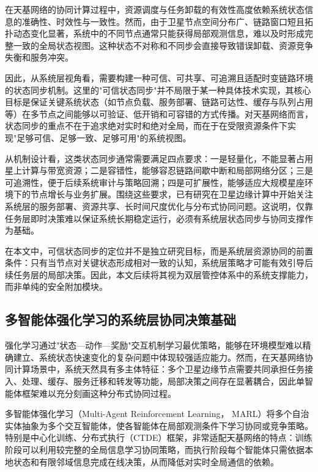 在天基网络的协同计算过程中，资源调度与任务卸载的有效性高度依赖系统状态信息的准确性、时效性与一致性。然而，由于卫星节点空间分布广、链路窗口短且拓扑动态变化显著，系统中的不同节点通常只能获得局部观测信息，难以及时形成完整一致的全局状态视图。这种状态不对称和不同步会直接导致错误卸载、资源竞争失衡和服务冲突。

因此，从系统层视角看，需要构建一种可信、可共享、可追溯且适配时变链路环境的状态同步机制。这里的"可信状态同步"并不局限于某一种具体技术实现，其核心目标是保证关键系统状态（如节点负载、服务部署、链路可达性、缓存与队列占用等）在多节点之间能够以可验证、低开销和可容错的方式传播。对天基网络而言，状态同步的重点不在于追求绝对实时和绝对全局，而在于在受限资源条件下实现"足够可信、足够一致、足够可用"的系统视图。

从机制设计看，这类状态同步通常需要满足四点要求：一是轻量化，不能显著占用星上计算与带宽资源；二是容错性，能够容忍链路间歇中断和局部网络分区；三是可追溯性，便于后续系统审计与策略回溯；四是可扩展性，能够适应大规模星座环境下的节点增长与业务扩展。围绕这些要求，已有研究在卫星边缘计算中开始关注系统层的服务部署、资源共享、长时间尺度优化与分布式协同问题\cite{Tang2024TwoTimescaleJSAC,Feng2026LatencyAware}。这说明，仅靠任务层即时决策难以保证系统长期稳定运行，必须有系统层状态同步与协同支撑作为基础。

在本文中，可信状态同步的定位并不是独立研究目标，而是系统层资源协同的前置条件：只有当节点对关键状态形成相对一致的认知，系统层策略才可能有效引导后续任务层的局部决策。因此，本文后续将其视为双层管控体系中的系统支撑能力，而非单纯的安全附加模块。

\subsection{多智能体强化学习的系统层协同决策基础}

强化学习通过"状态—动作—奖励"交互机制学习最优策略，能够在环境模型难以精确建立、系统状态快速变化的复杂问题中体现较强适应能力。然而，在天基网络协同计算场景中，系统天然具有多主体特征：多个卫星边缘节点需要共同承担任务接入、处理、缓存、服务迁移和转发等功能，局部决策之间存在显著耦合，因此单智能体框架难以充分刻画这种分布式协同过程。

多智能体强化学习（Multi-Agent Reinforcement Learning， MARL）将多个自治实体抽象为多个交互智能体，使各智能体在局部观测条件下学习协同或竞争策略。特别是中心化训练、分布式执行（CTDE）框架，非常适配天基网络的特点：训练阶段可以利用较完整的全局信息学习协同策略，而执行阶段每个智能体只需依据本地状态和有限邻域信息完成在线决策，从而降低对实时全局通信的依赖\cite{Li2024MARLComCom,Xiu2025MARATD3}。

